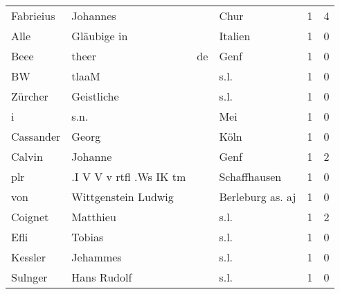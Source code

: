 \begin{tabular}{llllrr}
                Fabrieius &                           Johannes &             &                                        Chur &          1 &         4 \\
                     Alle &                        Gläubige in &             &                                     Italien &          1 &         0 \\
                     Beee &                              theer &          de &                                        Genf &          1 &         0 \\
                       BW &                              tlaaM &             &                                        s.l. &          1 &         0 \\
                  Zürcher &                         Geistliche &             &                                        s.l. &          1 &         0 \\
                        i &                               s.n. &             &                                         Mei &          1 &         0 \\
                Cassander &                              Georg &             &                                        Köln &          1 &         0 \\
                   Calvin &                            Johanne &             &                                        Genf &          1 &         2 \\
                      plr &            .I V V v rtfl .Ws IK tm &             &                                Schaffhausen &          1 &         0 \\
                      von &                Wittgenstein Ludwig &             &                            Berleburg as. aj &          1 &         0 \\
                  Coignet &                           Matthieu &             &                                        s.l. &          1 &         2 \\
                     Efli &                             Tobias &             &                                        s.l. &          1 &         0 \\
                  Kessler &                           Jehammes &             &                                        s.l. &          1 &         0 \\
                  Sulnger &                        Hans Rudolf &             &                                        s.l. &          1 &         0 \\

\end{tabular}
